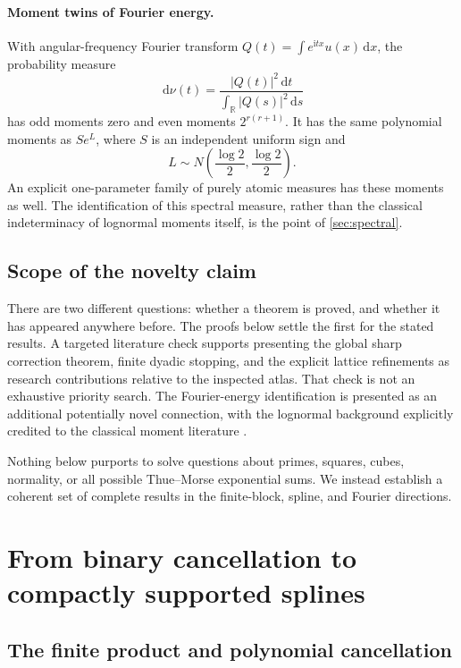 \documentclass[11pt,a4paper]{article}
\numberwithin{equation}{section}
\theoremstyle{definition}
\newcommand{\R}{\mathbb R}
\newcommand{\dd}{\,\mathrm d}
\newcommand{\ii}{\mathrm i}
\begin{document}
\paragraph{Moment twins of Fourier energy.}
With angular-frequency Fourier transform
$Q(t)=\int e^{\ii tx}u(x)\dd x$, the probability measure
\begin{equation}
 \dd\nu(t)=\frac{|Q(t)|^2\dd t}{\int_{\R}|Q(s)|^2\dd s}
 \label{eq:intro-nu}
\end{equation}
has odd moments zero and even moments $2^{r(r+1)}$. It has the same
polynomial moments as $S e^L$, where $S$ is an independent uniform sign
and
\begin{equation}
 L\sim N\left(\frac{\log2}{2},\frac{\log2}{2}\right).
 \label{eq:intro-lognormal}
\end{equation}
An explicit one-parameter family of purely atomic measures has these
moments as well. The identification of this spectral measure, rather
than the classical indeterminacy of lognormal moments itself, is the
point of \cref{sec:spectral}.

\subsection{Scope of the novelty claim}

There are two different questions: whether a theorem is proved, and
whether it has appeared anywhere before. The proofs below settle the
first for the stated results. A targeted literature check supports
presenting the global sharp correction theorem, finite dyadic stopping,
and the explicit lattice refinements as research contributions relative
to the inspected atlas. That check is not an exhaustive priority search.
The Fourier-energy identification is presented as an additional
potentially novel connection, with the lognormal background explicitly
credited to the classical moment literature \cite{heyde}.

Nothing below purports to solve questions about primes, squares, cubes,
normality, or all possible Thue--Morse exponential sums. We instead
establish a coherent set of complete results in the finite-block,
spline, and Fourier directions.

\section{From binary cancellation to compactly supported splines}\label{sec:basic}

\subsection{The finite product and polynomial cancellation}
\end{document}
